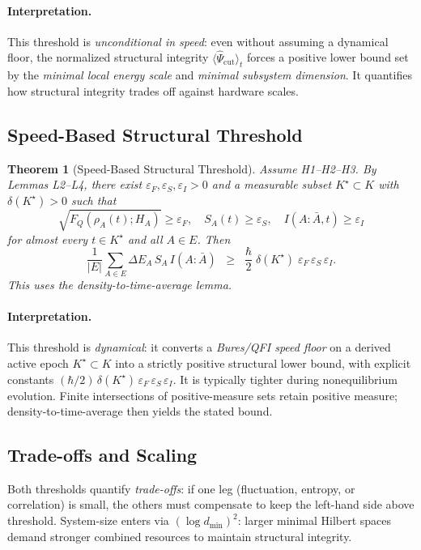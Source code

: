 \documentclass[10pt]{article}
\newtheorem{theorem}{Theorem}
\begin{document}
\paragraph{Interpretation.}
This threshold is \emph{unconditional in speed}: even without assuming a dynamical floor, the normalized
structural integrity $\langle \widehat{\Psi}_{\mathrm{cut}}\rangle_t$ forces a positive lower bound set by the
\emph{minimal local energy scale} and \emph{minimal subsystem dimension}. It quantifies how structural
integrity trades off against hardware scales.

\subsection{Speed-Based Structural Threshold}

\begin{theorem}[Speed-Based Structural Threshold]
\label{thm:speed-based}
Assume H1–H2–H3. By Lemmas L2–L4, there exist $\varepsilon_F,\varepsilon_S,\varepsilon_I>0$ and a measurable subset $K^\star\subset K$ with $\delta(K^\star)>0$ such that
\[
\sqrt{F_Q(\rho_A(t);H_A)}\ge \varepsilon_F,\quad
S_A(t)\ge \varepsilon_S,\quad
I(A:\bar{A},t)\ge \varepsilon_I
\]
for almost every $t\in K^\star$ and all $A\in E$. Then
\begin{equation}
\frac{1}{|E|}\sum_{A\in E} \Delta E_A\,S_A\,I(A:\bar{A})
\;\;\ge\;\; \frac{\hbar}{2}\;\delta(K^\star)\;\varepsilon_F\,\varepsilon_S\,\varepsilon_I.
\label{eq:speed-based-struct-threshold}
\end{equation}
This uses the density-to-time-average lemma.
\end{theorem}

\paragraph{Interpretation.}
This threshold is \emph{dynamical}: it converts a \emph{Bures/QFI speed floor} on a derived active epoch $K^\star\subset K$ into a
strictly positive structural lower bound, with explicit constants $(\hbar/2)\,\delta(K^\star)\,\varepsilon_F\,\varepsilon_S\,\varepsilon_I$.
It is typically tighter during nonequilibrium evolution. Finite intersections of positive-measure sets retain positive measure; density-to-time-average then yields the stated bound.

\subsection{Trade-offs and Scaling}
Both thresholds quantify \emph{trade-offs}: if one leg (fluctuation, entropy, or correlation) is small, the
others must compensate to keep the left-hand side above threshold. System-size enters via $(\log d_{\min})^2$:
larger minimal Hilbert spaces demand stronger combined resources to maintain structural integrity.
\end{document}

